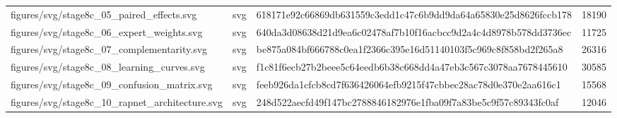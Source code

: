 \begin{tabular}{lllr}
figures/svg/stage8c_05_paired_effects.svg & svg & 618171e92c66869db631559c3edd1c47c6b9dd9da64a65830e25d8626fccb178 & 18190 \\
figures/svg/stage8c_06_expert_weights.svg & svg & 640da3d08638d21d9ea6c02478af7b10f16acbcc9d2a4c4d8978b578dd3736ec & 11725 \\
figures/svg/stage8c_07_complementarity.svg & svg & be875a084bf666788c0ea1f2366c395e16d51140103f5c969c8f858bd2f265a8 & 26316 \\
figures/svg/stage8c_08_learning_curves.svg & svg & f1c81f6ecb27b2beee5c64eedb6b38c668dd4a47eb3c567c3078aa7678445610 & 30585 \\
figures/svg/stage8c_09_confusion_matrix.svg & svg & feeb926da1cfcb8cd7f636426064efb9215f47cbbec28ac78d0e370e2aa616c1 & 15568 \\
figures/svg/stage8c_10_rapnet_architecture.svg & svg & 248d522aecfd49f147bc2788846182976e1fba09f7a83be5c9f57c89343fc0af & 12046 \\
\bottomrule
\end{tabular}
